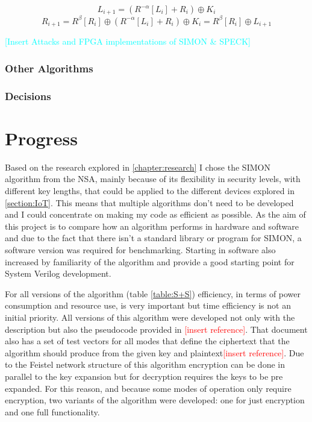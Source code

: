 \documentclass[12pt,twoside,a4paper]{report}
\begin{document}
    \begin{equation}
    \label{SPECK_L_round}
    L_{i+1} = (R^{-\alpha}[L_i] + R_i) \oplus K_i
    \end{equation}
    \begin{equation}
    \label{SPECK_R_round}
    R_{i+1} = R^{\beta}[R_i] \oplus (R^{-\alpha}[L_i] + R_i) \oplus K_i = R^{\beta}[R_i] \oplus L_{i+1}
    \end{equation}
    
    \textcolor{cyan}{[Insert Attacks and FPGA implementations of SIMON \& SPECK]}
    
    \subsection{Other Algorithms}
    
    \subsection{Decisions}
    
    \chapter{Progress}
    Based on the research explored in \autoref{chapter:research} I chose the SIMON algorithm from the NSA, mainly because of its flexibility in security levels, with different key lengths, that could be applied to the different devices explored in \autoref{section:IoT}. This means that multiple algorithms don't need to be developed and I could concentrate on making my code as efficient as possible. As the aim of this project is to compare how an algorithm performs in hardware and software and due to the fact that there isn't a standard library or program for SIMON, a software version was required for benchmarking. Starting in software also increased by familiarity of the algorithm and provide a good starting point for System Verilog development.
    
    For all versions of the algorithm (table \ref{table:S+S}) efficiency, in terms of power consumption and resource use, is very important but time efficiency is not an initial priority. All versions of this algorithm were developed not only with the description but also the pseudocode provided in \textcolor{red}{[insert reference]}. That document also has a set of test vectors for all modes that define the ciphertext that the algorithm should produce from the given key and plaintext\textcolor{red}{[insert reference]}. Due to the Feistel network structure of this algorithm encryption can be done in parallel to the key expansion but for decryption requires the keys to be pre expanded. For this reason, and because some modes of operation only require encryption, two variants of the algorithm were developed: one for just encryption and one full functionality.
    
\end{document}
